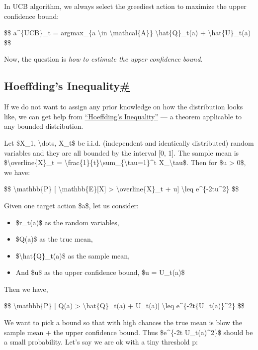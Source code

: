 In UCB algorithm, we always select the greediest action to maximize the upper confidence bound:

\$\$ a\^{}\{UCB\}\_t = argmax\_\{a \textbackslash in \textbackslash mathcal\{A\}\} \textbackslash hat\{Q\}\_t(a) + \textbackslash hat\{U\}\_t(a) \$\$

Now, the question is \emph{how to estimate the upper confidence bound}.

\subsection{\texorpdfstring{Hoeffding's Inequality\hyperref[hoeffdings-inequality]{\#}}{Hoeffding's Inequality\#}}\label{hoeffdings-inequality}

If we do not want to assign any prior knowledge on how the distribution looks like, we can get help from \href{http://cs229.stanford.edu/extra-notes/hoeffding.pdf}{``Hoeffding's Inequality''} --- a theorem applicable to any bounded distribution.

Let \$X\_1, \textbackslash dots, X\_t\$ be i.i.d. (independent and identically distributed) random variables and they are all bounded by the interval {[}0, 1{]}. The sample mean is \$\textbackslash overline\{X\}\_t = \textbackslash frac\{1\}\{t\}\textbackslash sum\_\{\textbackslash tau=1\}\^{}t X\_\textbackslash tau\$. Then for \$u \textgreater{} 0\$, we have:

\$\$ \textbackslash mathbb\{P\} {[} \textbackslash mathbb\{E\}{[}X{]} \textgreater{} \textbackslash overline\{X\}\_t + u{]} \textbackslash leq e\^{}\{-2tu\^{}2\} \$\$

Given one target action \$a\$, let us consider:

\begin{itemize}
\tightlist
\item
  \$r\_t(a)\$ as the random variables,
\item
  \$Q(a)\$ as the true mean,
\item
  \$\textbackslash hat\{Q\}\_t(a)\$ as the sample mean,
\item
  And \$u\$ as the upper confidence bound, \$u = U\_t(a)\$
\end{itemize}

Then we have,

\$\$ \textbackslash mathbb\{P\} {[} Q(a) \textgreater{} \textbackslash hat\{Q\}\_t(a) + U\_t(a){]} \textbackslash leq e\^{}\{-2t\{U\_t(a)\}\^{}2\} \$\$

We want to pick a bound so that with high chances the true mean is blow the sample mean + the upper confidence bound. Thus \$e\^{}\{-2t U\_t(a)\^{}2\}\$ should be a small probability. Let's say we are ok with a tiny threshold p:

